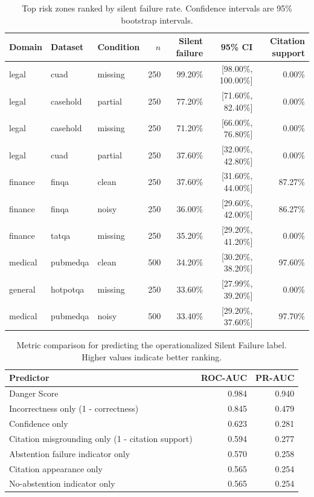 \begin{table}[t]
\centering
\caption{Top risk zones ranked by silent failure rate. Confidence intervals are 95\% bootstrap intervals.}
\label{tab:top-risk-zones}
\begin{tabular}{lllrrrr}
\toprule
Domain & Dataset & Condition & $n$ & Silent failure & 95\% CI & Citation support \\
\midrule
legal & cuad & missing & 250 & 99.20\% & [98.00\%, 100.00\%] & 0.00\% \\
legal & casehold & partial & 250 & 77.20\% & [71.60\%, 82.40\%] & 0.00\% \\
legal & casehold & missing & 250 & 71.20\% & [66.00\%, 76.80\%] & 0.00\% \\
legal & cuad & partial & 250 & 37.60\% & [32.00\%, 42.80\%] & 0.00\% \\
finance & finqa & clean & 250 & 37.60\% & [31.60\%, 44.00\%] & 87.27\% \\
finance & finqa & noisy & 250 & 36.00\% & [29.60\%, 42.00\%] & 86.27\% \\
finance & tatqa & missing & 250 & 35.20\% & [29.20\%, 41.20\%] & 0.00\% \\
medical & pubmedqa & clean & 500 & 34.20\% & [30.20\%, 38.20\%] & 97.60\% \\
general & hotpotqa & missing & 250 & 33.60\% & [27.99\%, 39.20\%] & 0.00\% \\
medical & pubmedqa & noisy & 500 & 33.40\% & [29.20\%, 37.60\%] & 97.70\% \\
\bottomrule
\end{tabular}
\end{table}

\begin{table}[t]
\centering
\caption{Metric comparison for predicting the operationalized Silent Failure label. Higher values indicate better ranking.}
\label{tab:metric-comparison}
\begin{tabular}{lrr}
\toprule
Predictor & ROC-AUC & PR-AUC \\
\midrule
Danger Score & 0.984 & 0.940 \\
Incorrectness only (1 - correctness) & 0.845 & 0.479 \\
Confidence only & 0.623 & 0.281 \\
Citation misgrounding only (1 - citation support) & 0.594 & 0.277 \\
Abstention failure indicator only & 0.570 & 0.258 \\
Citation appearance only & 0.565 & 0.254 \\
No-abstention indicator only & 0.565 & 0.254 \\
\bottomrule
\end{tabular}
\end{table}

